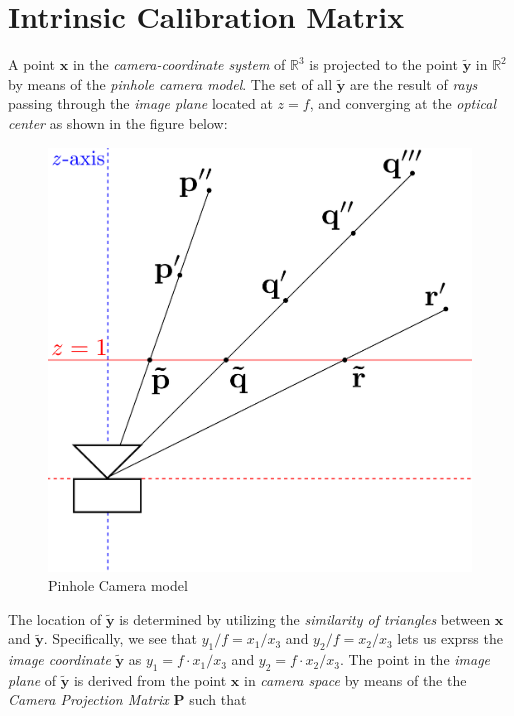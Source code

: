 \documentclass{report}
\begin{document}
\section{Intrinsic Calibration Matrix}

\par A point $\mathbf{x}$ in the \textit{camera-coordinate system} of $\mathbb{R}^3$ is projected to the point $\mathbf{\tilde{y}}$ in $\mathbb{R}^{2}$ by means of the \textit{pinhole camera model}. The set of all $\mathbf{\tilde{y}}$ are the result of \textit{rays} passing through the \textit{image plane} located at $z=f$, and converging at the \textit{optical center} as shown in the figure below:
\begin{figure}[htbp]
	\centering
%	
	\includegraphics[scale=0.25]{Camera}
	\caption{Pinhole Camera model}
\end{figure}
The location of $\mathbf{\tilde{y}}$ is determined by utilizing the \textit{similarity of triangles} between $\mathbf{x}$ and $\mathbf{\tilde{y}}$. Specifically, we see that $y_1/f=x_1/x_3$ and $y_2/f=x_2/x_3$ lets us exprss the \textit{image coordinate} $\mathbf{\tilde{y}}$ as $y_1=f\cdot x_1/x_3$ and $y_2=f\cdot x_2/x_3$. The point in the \textit{image plane} of $\mathbf{\tilde{y}}$ is derived from the point $\mathbf{x}$ in \textit{camera space} by means of the the \textit{Camera Projection Matrix} $\mathbf{P}$ such that
\end{document}
